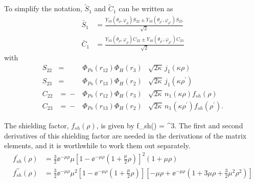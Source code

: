 \documentclass[Dissertation.tex]{subfiles}
\begin{document}
\noindent To simplify the notation, $\widetilde{S}_1$ and $\widetilde{C}_1$
can be written as
\begin{subequations}
\label{eq:PWaveSandCBar}
\begin{align}
\bar{S}_1 &= \frac{Y_{10}(\theta_\rho,\varphi_\rho)S_{22} \pm Y_{10}(\theta_{\rho^\prime},\varphi_{\rho'})S_{23} }{\sqrt{2}} \label{eq:PWaveSBar} \\
\bar{C}_1 &= \frac{Y_{10}(\theta_\rho,\varphi_\rho)C_{22} \pm Y_{10}(\theta_{\rho^\prime},\varphi_{\rho'})C_{23} }{\sqrt{2}} \label{eq:PWaveCBar} 
\end{align}
\end{subequations}
with
\begin{subequations}
\label{eq:PWaveSandC}
\begin{alignat}{2}
S_{22} &={}&\Phi_{Ps}\left(r_{12}\right) \Phi_H\left(r_3\right) &\sqrt{2\kappa} \,j_1\!\left(\kappa\rho\right) \label{eq:PWaveS22Def} \\
S_{23} &={}&\Phi_{Ps}\left(r_{13}\right) \Phi_H\left(r_2\right) &\sqrt{2\kappa} \,j_1\!\left(\kappa\rho^\prime\right) \label{eq:PWaveS23Def} \\
C_{22} &={}-&\Phi_{Ps}\left(r_{12}\right) \Phi_H\left(r_3\right) &\sqrt{2\kappa} \,n_1\!\left(\kappa\rho\right) f_{sh}(\rho) \label{eq:PWaveC22Def} \\
C_{23} &={}-&\Phi_{Ps}\left(r_{13}\right) \Phi_H\left(r_2\right) &\sqrt{2\kappa} \,n_1\!\left(\kappa\rho^\prime\right) f_{sh}(\rho^\prime). \label{eq:PWaveC23Def}
\end{alignat}
\end{subequations}

\noindent The shielding factor, $f_{sh}(\rho)$, is given by
\beq
f_{sh}(\rho) = ^3.
\label{eq:PWaveShielding}
\eeq
The first and second derivatives of this shielding factor are needed in the derivations of the matrix elements, and it is worthwhile to work them out separately.
\begin{subequations}
\label{eq:PWaveShieldingDer}
\begin{align}
f_{sh}^\prime(\rho) &= \frac{3}{2} \ee^{-\mu \rho} \mu \left[1 - \ee^{-\mu \rho} \left(1+\frac{\mu}{2}\rho\right)\right]^2 (1 + \mu\rho) \label{eq:PWaveShielding1} \\
f_{sh}^{\prime\prime}(\rho) &= \frac{3}{2} \ee^{-\mu \rho} \mu^2 \left[1 - \ee^{-\mu \rho} \left(1+\frac{\mu}{2}\rho\right)\right] \left[-\mu\rho + \ee^{-\mu \rho} \left(1+3\mu\rho+\frac{3}{2}\mu^2\rho^2\right)\right] \label{eq:PWaveShielding2}
\end{align}
\end{subequations}
\end{document}
